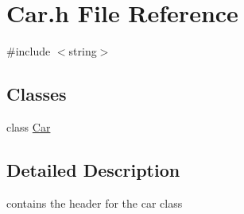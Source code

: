 \section{Car.\+h File Reference}
\label{_car_8h}
{\ttfamily \#include $<$string$>$}\newline
\subsection*{Classes}
\begin{DoxyCompactItemize}
\item 
class \hyperlink{class_car}{Car}
\end{DoxyCompactItemize}


\subsection{Detailed Description}
contains the header for the car class 